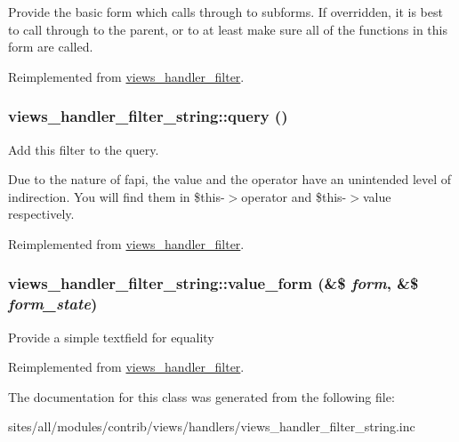 Provide the basic form which calls through to subforms. If overridden, it is best to call through to the parent, or to at least make sure all of the functions in this form are called. 

Reimplemented from \hyperlink{classviews__handler__filter_f14c69367162057a32709a6340de0988}{views\_\-handler\_\-filter}.\hypertarget{classviews__handler__filter__string_fcfdae379583a2eb912e1b82d4513503}{
\subsubsection[{query}]{\setlength{\rightskip}{0pt plus 5cm}views\_\-handler\_\-filter\_\-string::query ()}}
\label{classviews__handler__filter__string_fcfdae379583a2eb912e1b82d4513503}


Add this filter to the query.

Due to the nature of fapi, the value and the operator have an unintended level of indirection. You will find them in \$this-$>$operator and \$this-$>$value respectively. 

Reimplemented from \hyperlink{classviews__handler__filter_8e513b3abbc2559f37b550ca4957b4ae}{views\_\-handler\_\-filter}.\hypertarget{classviews__handler__filter__string_41c2ed02d24685d046eccd9e751ad916}{
\subsubsection[{value\_\-form}]{\setlength{\rightskip}{0pt plus 5cm}views\_\-handler\_\-filter\_\-string::value\_\-form (\&\$ {\em form}, \/  \&\$ {\em form\_\-state})}}
\label{classviews__handler__filter__string_41c2ed02d24685d046eccd9e751ad916}


Provide a simple textfield for equality 

Reimplemented from \hyperlink{classviews__handler__filter_9168b39edae84b20e01a3fd0d810ba66}{views\_\-handler\_\-filter}.

The documentation for this class was generated from the following file:\begin{CompactItemize}
\item 
sites/all/modules/contrib/views/handlers/views\_\-handler\_\-filter\_\-string.inc\end{CompactItemize}
